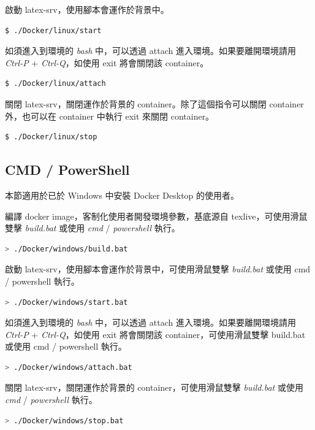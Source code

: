 啟動 latex-srv，使用腳本會運作於背景中。
\begin{lstlisting}[language=bash]
        $ ./Docker/linux/start
\end{lstlisting}

如須進入到環境的 \emph{bash} 中，可以透過 attach 進入環境。如果要離開環境請用 \emph{Ctrl-P} + \emph{Ctrl-Q}，如使用 exit 將會關閉該 container。
\begin{lstlisting}[language=bash] 
        $ ./Docker/linux/attach
\end{lstlisting}

關閉 latex-srv，關閉運作於背景的 container。除了這個指令可以關閉 container 外，也可以在 container 中執行 exit 來關閉 container。
\begin{lstlisting}[language=bash]
        $ ./Docker/linux/stop
\end{lstlisting}

\newpage

\subsection{CMD / PowerShell}

本節適用於已於 Windows 中安裝 Docker Desktop 的使用者。

編譯 docker image，客制化使用者開發環境參數，基底源自 texlive\cite{docker_texlive}，可使用滑鼠雙擊 \emph{build.bat} 或使用 \emph{cmd} / \emph{powershell} 執行。
\begin{lstlisting}[language=bash]
        > ./Docker/windows/build.bat
\end{lstlisting}

啟動 latex-srv，使用腳本會運作於背景中，可使用滑鼠雙擊 \emph{build.bat} 或使用 cmd / powershell 執行。
\begin{lstlisting}[language=bash]
        > ./Docker/windows/start.bat
\end{lstlisting}

如須進入到環境的 \emph{bash} 中，可以透過 attach 進入環境。如果要離開環境請用 \emph{Ctrl-P} + \emph{Ctrl-Q}，如使用 exit 將會關閉該 container，可使用滑鼠雙擊 build.bat 或使用 cmd / powershell 執行。
\begin{lstlisting}[language=bash]
        > ./Docker/windows/attach.bat
\end{lstlisting}

關閉 latex-srv，關閉運作於背景的 container，可使用滑鼠雙擊 \emph{build.bat} 或使用 \emph{cmd} / \emph{powershell} 執行。
\begin{lstlisting}[language=bash]
        > ./Docker/windows/stop.bat
\end{lstlisting}

